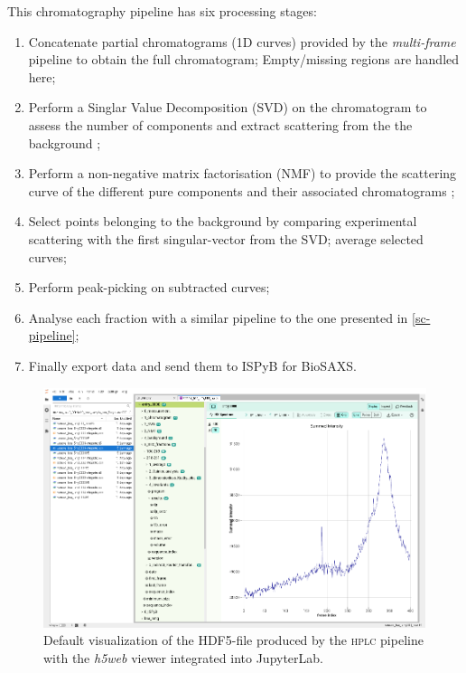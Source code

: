 \documentclass[preprint]{iucr}              %
\begin{document}
This chromatography pipeline has six processing stages:
\begin{enumerate}
    \item Concatenate partial chromatograms (1D curves) provided by the \textit{multi-frame} pipeline to obtain the full chromatogram; Empty/missing regions are handled here;
    \item Perform a Singlar Value Decomposition (SVD) on the chromatogram to assess the number of components and extract scattering from the the background \cite{BioXTAS}; 
    \item Perform a non-negative matrix factorisation (NMF) to provide the scattering curve of the different pure components and their associated chromatograms \cite{NMF-SEC_SAXS}; 
    \item Select points belonging to the background by comparing experimental scattering with the first singular-vector from the SVD; average selected curves; %
    \item Perform peak-picking on subtracted curves; 
    \item Analyse each fraction with a similar pipeline to the one presented in \ref{sc-pipeline}; %
    \item Finally export data and send them to ISPyB for BioSAXS.
\end{enumerate}

\begin{figure}
    \label{hplc}
    \includegraphics[width=12cm]{HPLC-h5web.eps}
    \caption{Default visualization of the HDF5-file produced by the \textsc{hplc} pipeline with the \textit{h5web} viewer integrated into JupyterLab.}
\end{figure}
\end{document}
